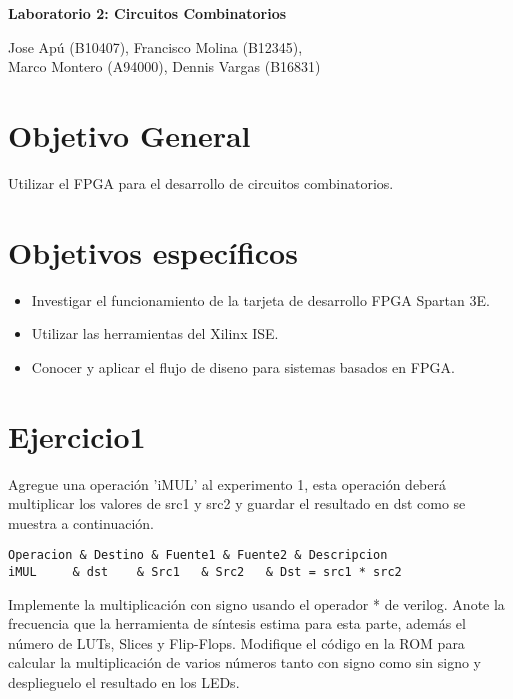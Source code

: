 \documentclass[10pt]{article}
\begin{document}
\begin{huge}
\begin{center}
\textbf{Laboratorio 2: Circuitos Combinatorios}
\end{center}
\end{huge}

\begin{Large}
\begin{center}
Jose Apú (B10407), Francisco Molina (B12345), \\Marco Montero (A94000), Dennis Vargas (B16831)
\end{center}
\end{Large}


\section*{Objetivo General}
Utilizar el FPGA para el desarrollo de circuitos combinatorios.

\section*{Objetivos específicos}
\begin{itemize}
\item Investigar el funcionamiento de la tarjeta de desarrollo FPGA Spartan 3E.
\item Utilizar las herramientas del Xilinx ISE.
\item Conocer y aplicar el flujo de diseno para sistemas basados en FPGA.
\end{itemize}

\newpage

\section*{Ejercicio1}
 Agregue una operación 'iMUL' al experimento 1, esta operación deberá multiplicar los valores de src1 y src2 y guardar el resultado en dst como se muestra a continuación.
\begin{lstlisting}
Operacion & Destino & Fuente1 & Fuente2 & Descripcion 
iMUL 	 & dst    & Src1   & Src2   & Dst = src1 * src2  
\end{lstlisting}

Implemente la multiplicación con signo usando el operador * de verilog. Anote la frecuencia que la herramienta de síntesis estima para esta parte, además el número de LUTs, Slices y Flip-Flops. Modifique el código en la ROM para calcular la multiplicación de varios números tanto con signo como sin signo y desplieguelo el resultado en los LEDs.
\end{document}
